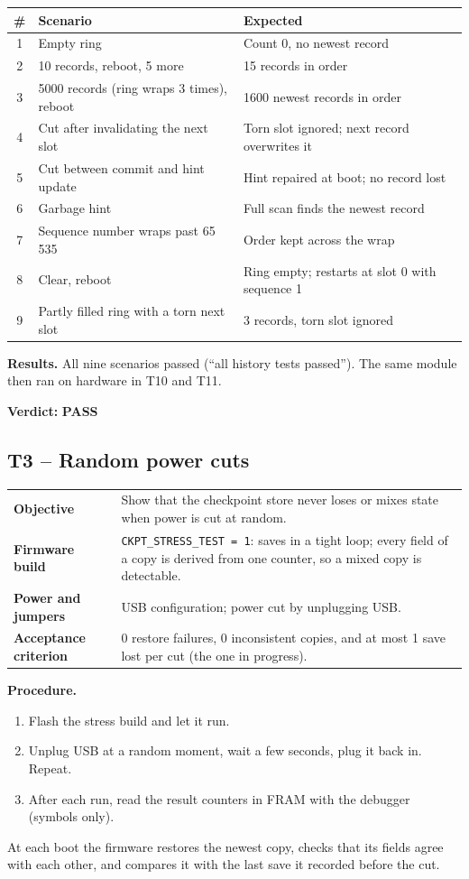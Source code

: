 \documentclass[11pt,a4paper]{article}
\makeatletter
\newcommand{\code}[1]{\texttt{#1}}
\newcommand{\pass}{\textbf{\textcolor{green!45!black}{PASS}}}
\newcommand{\testcase}[7]{%
  \subsection{#1 -- #2}\label{#3}
  \noindent\begin{tabularx}{\textwidth}{@{}>{\raggedright\arraybackslash\bfseries}p{3.6cm}L@{}}
  \toprule
  Objective & #4 \\
  Firmware build & #5 \\
  Power and jumpers & #6 \\
  Acceptance criterion & #7 \\
  \bottomrule
  \end{tabularx}\par\medskip}
\makeatother
\begin{document}
\begin{table}[H]
\centering\small
\begin{tabularx}{\textwidth}{@{}clL@{}}
\toprule
\# & Scenario & Expected \\
 & Empty ring & Count 0, no newest record \\
2 & 10 records, reboot, 5 more & 15 records in order \\
3 & 5000 records (ring wraps 3 times), reboot & 1600 newest records in order \\
4 & Cut after invalidating the next slot & Torn slot ignored; next record overwrites it \\
5 & Cut between commit and hint update & Hint repaired at boot; no record lost \\
6 & Garbage hint & Full scan finds the newest record \\
7 & Sequence number wraps past 65\,535 & Order kept across the wrap \\
8 & Clear, reboot & Ring empty; restarts at slot 0 with sequence 1 \\
9 & Partly filled ring with a torn next slot & 3 records, torn slot ignored \\
\bottomrule
\end{tabularx}
\end{table}

\textbf{Results.} All nine scenarios passed (``all history tests passed''). The same module then ran on hardware in T10 and T11.

\textbf{Verdict:} \pass

\testcase{T3}{Random power cuts}{t:cuts}
  {Show that the checkpoint store never loses or mixes state when power is cut at random.}
  {\code{CKPT\_STRESS\_TEST = 1}: saves in a tight loop; every field of a copy is derived from one counter, so a mixed copy is detectable.}
  {USB configuration; power cut by unplugging USB.}
  {0 restore failures, 0 inconsistent copies, and at most 1 save lost per cut (the one in progress).}

\textbf{Procedure.}
\begin{enumerate}
  \item Flash the stress build and let it run.
  \item Unplug USB at a random moment, wait a few seconds, plug it back in. Repeat.
  \item After each run, read the result counters in FRAM with the debugger (symbols only).
\end{enumerate}
At each boot the firmware restores the newest copy, checks that its fields agree with each other, and compares it with the last save it recorded before the cut.
\end{document}
